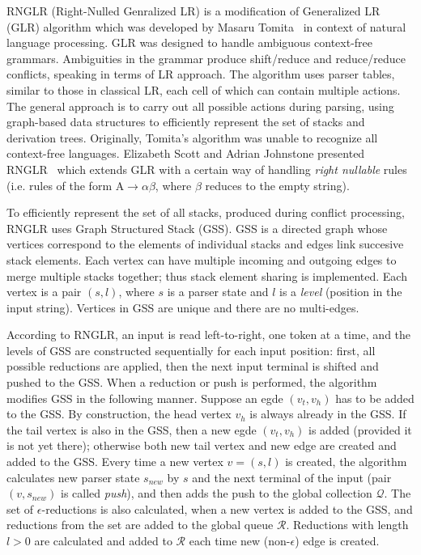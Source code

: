 RNGLR (Right-Nulled Genralized LR) is a modification of Generalized LR (GLR) algorithm which
was developed by Masaru Tomita~\cite{Tomita} in context of natural language processing. 
GLR was designed to handle ambiguous context-free grammars. Ambiguities in the grammar produce 
shift/reduce and reduce/reduce conflicts, speaking in terms of LR approach. The algorithm 
uses parser tables, similar to those in classical LR, each cell of which can contain multiple 
actions. The general approach is to carry out all possible actions during parsing, 
using graph-based data structures to efficiently represent the set of stacks 
and derivation trees. Originally, Tomita's algorithm was unable to recognize all context-free languages.  
Elizabeth Scott and Adrian Johnstone presented RNGLR~\cite{RNGLR}
which extends GLR with a certain way of handling \emph{right nullable} 
rules (i.e. rules of the form $\mathrm{A} \rightarrow \alpha \beta$, where $\beta$ 
reduces to the empty string). 

To efficiently represent the set of all stacks, produced during conflict processing,
RNGLR uses Graph Structured Stack (GSS). GSS is a directed graph 
whose vertices correspond to the elements of individual stacks and edges link succesive
stack elements. Each vertex can have multiple incoming and outgoing edges to merge 
multiple stacks together; thus stack element sharing is implemented. Each vertex is 
a pair $(s, l)$, where $s$ is a parser state and $l$ is a \emph{level} (position in the input string). 
Vertices in GSS are unique and there are no multi-edges. 

According to RNGLR, an input is read left-to-right, one token at a time, and 
the levels of GSS are constructed sequentially for each input position: first, all  
possible reductions are applied, then the next input terminal is shifted and
pushed to the GSS. When a reduction or push is performed, 
the algorithm modifies GSS in the following manner. Suppose an 
egde $(v_t, v_h)$ has to be added to the GSS. By construction, the head vertex
$v_h$ is always already in the GSS. If the tail vertex is also in the GSS, then
a new egde $(v_t, v_h)$ is added (provided it is not yet there); otherwise both 
new tail vertex and new edge are created and added to the GSS. Every time a new 
vertex $v=(s, l)$ is created, the algorithm calculates new parser state $s_{new}$ by $s$ 
and the next terminal of the input 
(pair $(v, s_{new})$ is called \emph{push}), and then adds the push to the global 
collection $\mathcal{Q}$. The set of $\epsilon$-reductions 
is also calculated, when a new vertex is added to the GSS, and reductions from the set are added to the 
global queue $\mathcal{R}$. Reductions with length $l>0$ are calculated and added to $\mathcal{R}$ 
each time new (non-$\epsilon$) edge is created. 

